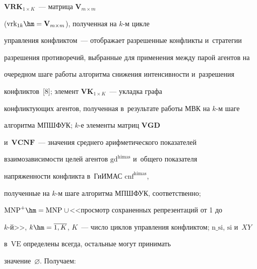 $\mathbf{VRK}_{1\times K}$~--- мат\-ри\-ца $\mathbf{V}_{m\times m}$ 

($\mathrm{vrk}_{1k}\hm= \mathbf{V}_{m\times m}$), полученная на $k$-м цикле 

управления конфликтом~--- отображает разрешенные конфликты и~стратегии 

разрешения противоречий, выбранные для применения между парой агентов на 

очередном шаге работы алгоритма снижения интенсивности и~разрешения 

конфликтов~[8]; элемент $\mathbf{VK}_{1\times K}$~--- укладка графа 

конфликтующих агентов, полученная в~результате работы МВК на $k$-м шаге 

алгоритма \mbox{МПШФУК};  $k$-е элементы матриц $\mathbf{VGD}$ 

и~$\mathbf{VCNF}$~--- значения среднего арифметического показателей 

взаимозависимости целей агентов $\mathrm{gd}^{\mathrm{himas}}$ и~общего показателя 

напряженности конфликта в~\mbox{ГиИМАС} $\mathrm{cnf}^{\mathrm{himas}}$, 

полученные на \mbox{$k$-м} шаге алгоритма \mbox{МПШФУК}, соответственно; 

$\mathrm{MNP}^+\hm= \mathrm{MNP}\;\cup$\;<<про\-смотр сохраненных репрезентаций от 1 до 

$k$-й>>, $k\hm= \overline{1,K}$, $K$~--- число циклов управления конфликтом; $\mathrm{n\_si}$, $\mathrm{si}$ и~$XY$ 

в~$\mathrm{VE}$ определены всегда, остальные могут принимать 

значение~$\varnothing$. Получаем:



\vspace*{-2pt} 



